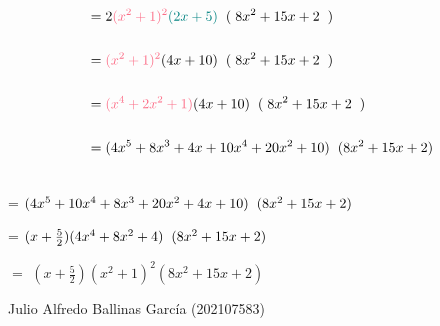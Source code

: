 \documentclass[12pt]{article}
\renewcommand{\qedsymbol}{$\blacksquare$}
\begin{document}
\begin{equation*}
\begin{split}
         & = 2 {\textcolor{wildwatermelon}{(x^{2} + 1)^{2}}} {\textcolor{tealgreen}{(2x+5)}} \hspace{0.2cm} (\hspace{0.1cm}8x^{2} + 15x +2 \hspace{0.2cm})\\\\ 
         & = {\textcolor{wildwatermelon}{(x^{2} + 1)^{2}}} {(4x+10)} \hspace{0.2cm} (\hspace{0.1cm}8x^{2} + 15x +2 \hspace{0.2cm} )\\\\ 
         & = {\textcolor{wildwatermelon}{(x^{4} + 2x^{2}+1)}} {(4x+10)} \hspace{0.2cm} (\hspace{0.1cm}8x^{2} + 15x +2 \hspace{0.2cm})\\\\ 
         & = (4x^{5} + 8x^{3}+4x+10x^{4}+20x^{2}+10) \hspace{0.2cm} (8x^{2} + 15x +2)\\\\ 
    \end{split}
\end{equation*} \vspace{0.1cm} 

\hspace{1.39cm}= $(4x^{5} +10x^{4}+ 8x^{3}+20x^{2}+4x+10) \hspace{0.2cm} (8x^{2} + 15x +2)$\vspace{0.4cm}

\hspace{1.39cm}= $(x+\frac{5}{2}) (4x^{4} + 8x^{2} + 4) \hspace{0.2cm} (8x^{2} + 15x +2)$\vspace{0.4cm}

 $=$ $(x+\frac{5}{2}) (x^{2} + 1)^{2}(8x^{2} + 15x +2)$  \hspace{.5cm}{\textcolor{ticklemepink}{\qedsymbol}}  \vspace{2cm}



\hspace{9cm}\textsf{Julio Alfredo Ballinas García (202107583)}



 
\end{document}
